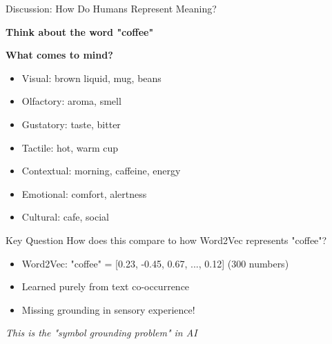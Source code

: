 \documentclass[aspectratio=169]{beamer}
\begin{document}
\begin{frame}[shrink=10]{Discussion: How Do Humans Represent Meaning? 🤔}
\begin{center}
\Large
\textbf{Think about the word "coffee"}
\end{center}

\vspace{1em}

\textbf{What comes to mind?}
\begin{itemize}\setlength{\itemsep}{0pt}
    \item Visual: brown liquid, mug, beans
    \item Olfactory: aroma, smell
    \item Gustatory: taste, bitter
    \item Tactile: hot, warm cup
    \item Contextual: morning, caffeine, energy
    \item Emotional: comfort, alertness
    \item Cultural: cafe, social
\end{itemize}

\vspace{1em}

\begin{alertblock}{Key Question}
How does this compare to how Word2Vec represents "coffee"?
\begin{itemize}\setlength{\itemsep}{0pt}
    \item Word2Vec: "coffee" = [0.23, -0.45, 0.67, ..., 0.12] (300 numbers)
    \item Learned purely from text co-occurrence
    \item Missing grounding in sensory experience!
\end{itemize}
\end{alertblock}

\small
\textit{This is the "symbol grounding problem" in AI}
\end{frame}
\end{document}
